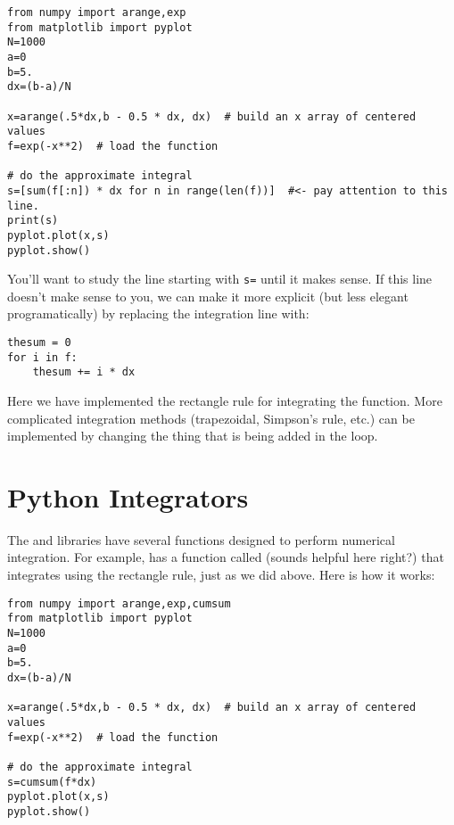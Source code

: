 \begin{Verbatim}
from numpy import arange,exp
from matplotlib import pyplot
N=1000
a=0
b=5.
dx=(b-a)/N

x=arange(.5*dx,b - 0.5 * dx, dx)  # build an x array of centered values
f=exp(-x**2)  # load the function

# do the approximate integral
s=[sum(f[:n]) * dx for n in range(len(f))]  #<- pay attention to this line.
print(s)
pyplot.plot(x,s)
pyplot.show()
\end{Verbatim}
You'll want to study the line starting with \verb!s=! until it makes
sense.  If this line doesn't make sense to you, we can make it more
explicit (but less elegant programatically) by replacing the
integration line with:
\begin{Verbatim}
thesum = 0
for i in f:
    thesum += i * dx

\end{Verbatim}

Here we have implemented the rectangle rule for integrating the function.
More complicated integration methods (trapezoidal, Simpson's rule,
etc.) can be implemented by changing the thing that is being added in
the loop.

\section{Python Integrators}
The  and  libraries have several functions
designed to perform numerical integration.  For example, 
has a function called  (sounds helpful here right?) that
integrates using the rectangle rule, just as we did above. Here is how
it works:

\begin{Verbatim}
from numpy import arange,exp,cumsum
from matplotlib import pyplot
N=1000
a=0
b=5.
dx=(b-a)/N

x=arange(.5*dx,b - 0.5 * dx, dx)  # build an x array of centered values
f=exp(-x**2)  # load the function

# do the approximate integral
s=cumsum(f*dx)
pyplot.plot(x,s)
pyplot.show()
\end{Verbatim}

